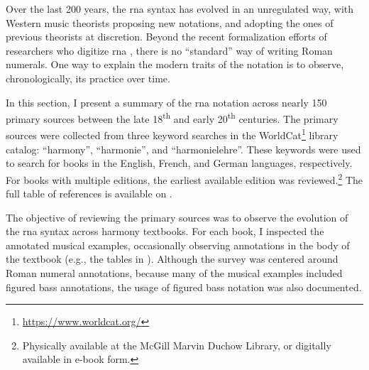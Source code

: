 

Over the last 200 years, the \gls{rna} syntax has evolved in
an unregulated way, with Western music theorists proposing
new notations, and adopting the ones of previous theorists
at discretion. Beyond the recent formalization efforts of
researchers who digitize \gls{rna}
\parencite{huron1994humdrum, napoleslopez2017automatic,
neuwirth2018annotated, gotham2019romantext,
napoleslopez2020harmalysis, hentschel2021annotated}, there
is no ``standard'' way of writing Roman numerals. One way to
explain the modern traits of the notation is to observe,
chronologically, its practice over time.

In this section, I present a summary of the \gls{rna}
notation across nearly 150 primary sources between the late
18\textsuperscript{th} and early 20\textsuperscript{th}
centuries. The primary sources were collected from three
keyword searches in the
WorldCat\footnote{\href{https://www.worldcat.org/}{https://www.worldcat.org/}}
library catalog: ``harmony'', ``harmonie'', and
``harmonielehre''. These keywords were used to search for
books in the English, French, and German languages,
respectively. For books with multiple editions, the earliest
available edition was reviewed.\footnote{Physically
available at the McGill Marvin Duchow Library, or digitally
available in e-book form.} The full table of references is
available on .


The objective of reviewing the primary sources was to
observe the evolution of the \gls{rna} syntax across harmony
textbooks. For each book, I inspected the annotated musical
examples, occasionally observing annotations in the body of
the textbook (e.g., the tables in
\textcite{kirnberger1774kunst}). Although the survey was
centered around Roman numeral annotations, because many of
the musical examples included figured bass annotations, the
usage of figured bass notation was also documented. 
